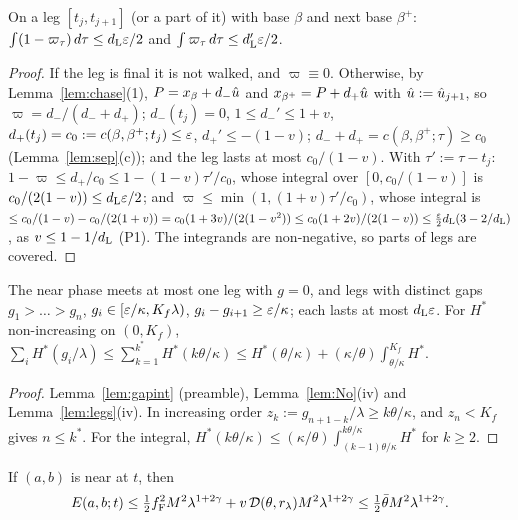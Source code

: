 \begin{lemma}\label{lem:Na}
On a leg $[t_j,t_{j+1}]$ \textup(or a part of it\textup) with base $\beta$ and next base $\beta^+$:
$\int(1-\varpi_\tau)\,d\tau\le d_{\mathrm L}\varepsilon/2$ and $\int\varpi_\tau\,d\tau\le d_{\mathrm L}'\varepsilon/2$.
\end{lemma}

\begin{proof}
If the leg is final it is not walked, and $\varpi\equiv0$. Otherwise, by Lemma~\ref{lem:chase}(1), $P=x_\beta+d_-\hat u$ and
$x_{\beta^+}=P+d_+\hat u$ with $\hat u:=\hat u_{j+1}$, so $\varpi=d_-/(d_-+d_+)$; $d_-(t_j)=0$, $1\le d_-'\le1+v$,
$d_+(t_j)=c_0:=c(\beta,\beta^+;t_j)\le\varepsilon$, $d_+'\le-(1-v)$; $d_-+d_+=c(\beta,\beta^+;\tau)\ge c_0$ (Lemma~\ref{lem:sep}(c)); and the leg lasts
at most $c_0/(1-v)$. With $\tau':=\tau-t_j$: $1-\varpi\le d_+/c_0\le1-(1-v)\tau'/c_0$, whose integral over $[0,c_0/(1-v)]$ is
$c_0/(2(1-v))\le d_{\mathrm L}\varepsilon/2$; and $\varpi\le\min(1,(1+v)\tau'/c_0)$, whose integral is $\le c_0/(1-v)-c_0/(2(1+v))=c_0(1+3v)/(2(1-v^2))\le
c_0(1+2v)/(2(1-v))\le\frac{\varepsilon}2d_{\mathrm L}(3-2/d_{\mathrm L})$, as $v\le1-1/d_{\mathrm L}$ (P1). The integrands are non-negative, so parts of legs are covered.
\end{proof}

\begin{lemma}\label{lem:Nsum}
The near phase meets at most one leg with $g=0$, and legs with distinct gaps $g_1>\dots>g_n$, $g_i\in[\varepsilon/\kappa,K_f\lambda)$,
$g_i-g_{i+1}\ge\varepsilon/\kappa$; each lasts at most $d_{\mathrm L}\varepsilon$. For $H^*$ non-increasing on $(0,K_f)$,
$\sum_iH^*(g_i/\lambda)\le\sum_{k=1}^{k^*}H^*(k\theta/\kappa)\le H^*(\theta/\kappa)+(\kappa/\theta)\int_{\theta/\kappa}^{K_f}H^*$.
\end{lemma}

\begin{proof}
Lemma~\ref{lem:gapint} (preamble), Lemma~\ref{lem:No}(iv) and Lemma~\ref{lem:legs}(iv). In increasing order $z_k:=g_{n+1-k}/\lambda\ge
k\theta/\kappa$, and $z_n<K_f$ gives $n\le k^*$. For the integral, $H^*(k\theta/\kappa)\le(\kappa/\theta)\int_{(k-1)\theta/\kappa}^{k\theta/\kappa}H^*$
for $k\ge2$.
\end{proof}

\begin{proposition}\label{prop:near}
If $(a,b)$ is near at $t$, then
\[
E(a,b;t)\le\tfrac12f_{\mathrm F}^2M^2\lambda^{1+2\gamma}+v\,\mathcal D(\theta,r_\lambda)M^2\lambda^{1+2\gamma}\le\tfrac12\bar\theta M^2\lambda^{1+2\gamma}.
\]
\end{proposition}

